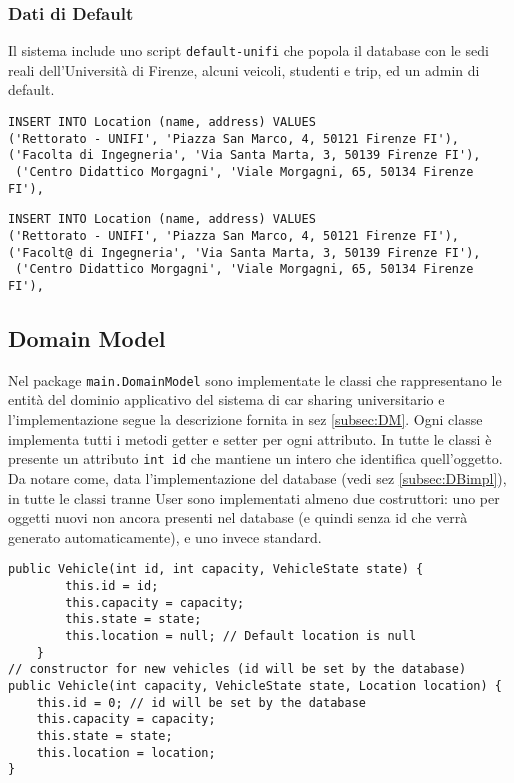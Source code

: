 \subsubsection{Dati di Default}
Il sistema include uno script \texttt{default-unifi} che popola il database con le sedi reali dell'Università di Firenze, alcuni veicoli, studenti e trip, ed un admin di default.
\begin{lstlisting}[style=sql, caption={Esempio inserimento dati di default per le location}]
INSERT INTO Location (name, address) VALUES
('Rettorato - UNIFI', 'Piazza San Marco, 4, 50121 Firenze FI'),
('Facolta di Ingegneria', 'Via Santa Marta, 3, 50139 Firenze FI'),
 ('Centro Didattico Morgagni', 'Viale Morgagni, 65, 50134 Firenze FI'),
\end{lstlisting}
\begin{lstlisting}[style=sql, caption={Esempio inserimento dati di default per le location}]
INSERT INTO Location (name, address) VALUES
('Rettorato - UNIFI', 'Piazza San Marco, 4, 50121 Firenze FI'),
('Facolt@ di Ingegneria', 'Via Santa Marta, 3, 50139 Firenze FI'),
 ('Centro Didattico Morgagni', 'Viale Morgagni, 65, 50134 Firenze FI'),
\end{lstlisting}

\subsection{Domain Model}
Nel package \texttt{main.DomainModel} sono implementate le classi che rappresentano le entità del dominio applicativo del sistema di car sharing universitario e  l'implementazione segue la descrizione fornita in sez \ref{subsec:DM}. Ogni classe implementa tutti i metodi getter e setter per ogni attributo.
In tutte le classi è presente un attributo \texttt{int id} che mantiene un intero che identifica quell'oggetto.\\
Da notare come, data l'implementazione del database (vedi sez \ref{subsec:DBimpl}), in tutte le classi tranne User sono implementati almeno due costruttori: uno per oggetti nuovi non ancora presenti nel database (e quindi senza id che verrà generato automaticamente), e uno invece standard.
\begin{lstlisting}[style=java, caption={Esempio di costruttori della classe \texttt{Vehicle}}]
public Vehicle(int id, int capacity, VehicleState state) {
        this.id = id;
        this.capacity = capacity;
        this.state = state;
        this.location = null; // Default location is null
    }
// constructor for new vehicles (id will be set by the database)
public Vehicle(int capacity, VehicleState state, Location location) {
    this.id = 0; // id will be set by the database
    this.capacity = capacity;
    this.state = state;
    this.location = location;
}
\end{lstlisting}
